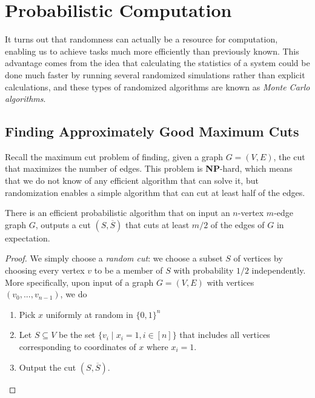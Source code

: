 \section{Probabilistic Computation}

  It turns out that randomness can actually be a resource for computation, enabling us to achieve tasks much more efficiently than previously known. This advantage comes from the idea that calculating the statistics of a system could be done much faster by running several randomized simulations rather than explicit calculations, and these types of randomized algorithms are known as \textit{Monte Carlo algorithms}. 

\subsection{Finding Approximately Good Maximum Cuts}

  Recall the maximum cut problem of finding, given a graph $G = (V, E)$, the cut that maximizes the number of edges. This problem is \textbf{NP}-hard, which means that we do not know of any efficient algorithm that can solve it, but randomization enables a simple algorithm that can cut at least half of the edges. 

  \begin{theorem}
    \label{thm:approximating-max-cut}
  There is an efficient probabilistic algorithm that on input an $n$-vertex $m$-edge graph $G$, outputs a cut $(S, \overline{S})$ that cuts at least $m/2$ of the edges of $G$ in expectation. 
  \end{theorem}
  \begin{proof}
  We simply choose a \textit{random cut}: we choose a subset $S$ of vertices by choosing every vertex $v$ to be a member of $S$ with probability $1/2$ independently. More specifically, upon input of a graph $G = (V, E)$ with vertices $(v_0, ..., v_{n-1})$, we do
  \begin{enumerate}
      \item Pick $x$ uniformly at random in $\{0,1\}^n$
      \item Let $S \subseteq V$ be the set $\{v_i \;|\; x_i = 1, i \in [n]\}$ that includes all vertices corresponding to coordinates of $x$ where $x_i = 1$. 
      \item Output the cut $(S, \overline{S})$. 
  \end{enumerate}
  \end{proof}

